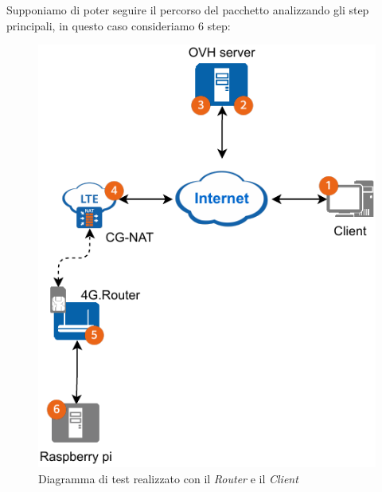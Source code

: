 Supponiamo di poter seguire il percorso del pacchetto analizzando gli step principali, in questo caso consideriamo 6 step:

\begin{figure}[H]
    \centering
    \includegraphics[width=0.5\linewidth]{immagini/diag2-test_real}
    \caption{Diagramma di test realizzato con il \textit{Router} e il \textit{Client}}
    \label{fig:diag-test-real}
\end{figure}


